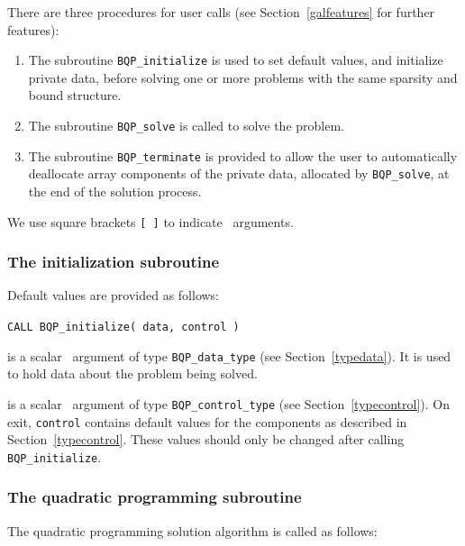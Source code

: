 \documentclass{galahad}
\newcommand{\packagename}{BQP}
\begin{document}
\galarguments
There are three procedures for user calls
(see Section~\ref{galfeatures} for further features): 

\begin{enumerate}
\item The subroutine 
      {\tt \packagename\_initialize} 
      is used to set default values, and initialize private data, 
      before solving one or more problems with the
      same sparsity and bound structure.
\item The subroutine 
      {\tt \packagename\_solve} 
      is called to solve the problem.
\item The subroutine 
      {\tt \packagename\_terminate} 
      is provided to allow the user to automatically deallocate array 
       components of the private data, allocated by 
       {\tt \packagename\_solve}, 
       at the end of the solution process. 
\end{enumerate}
We use square brackets {\tt [ ]} to indicate \optional\ arguments.


\subsubsection{The initialization subroutine}\label{subinit}
 Default values are provided as follows:
\vspace*{1mm}

\hspace{8mm}
{\tt CALL \packagename\_initialize( data, control )}

\vspace*{-3mm}
\begin{description}

 is a scalar \intentinout\ argument of type 
{\tt \packagename\_data\_type}
(see Section~\ref{typedata}). It is used to hold data about the problem being 
solved. 

 is a scalar \intentout\ argument of type 
{\tt \packagename\_control\_type}
(see Section~\ref{typecontrol}). 
On exit, {\tt control} contains default values for the components as
described in Section~\ref{typecontrol}.
These values should only be changed after calling 
{\tt \packagename\_initialize}.

\end{description}


\subsubsection{The quadratic programming subroutine}\label{qps}
The quadratic programming solution algorithm is called as follows:
\vspace*{1mm}
\end{document}

